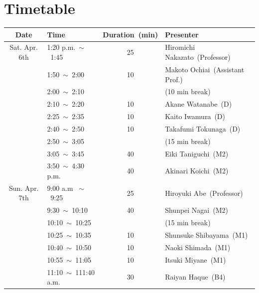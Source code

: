 \documentclass[unicode,a4paper,11pt]{ltjsarticle}
\begin{document}
\clearpage

\section{Timetable}

\begin{center}
      \begin{tabular}{clcl}\hline
            Date          & Time                       & Duration\ (min) & Presenter                        \\ \hline
            Sat. Apr. 6th & 1:20 p.m.\ $\sim$\ 1:45    & 25              & Hiromichi Nakazato\ (Professor)  \\
                          & 1:50\ $\sim$\ 2:00         & 10              & Makoto Ochiai\ (Assistant Prof.) \\
                          & 2:00\ $\sim$\ 2:10         &                 & (10 min break)                   \\
                          & 2:10\ $\sim$\ 2:20         & 10              & Akane Watanabe\ (D)              \\
                          & 2:25\ $\sim$\ 2:35         & 10              & Kaito Iwamura\ (D)               \\
                          & 2:40\ $\sim$\ 2:50         & 10              & Takafumi Tokunaga\ (D)           \\
                          & 2:50\ $\sim$\ 3:05         &                 & (15 min break)                   \\
                          & 3:05\ $\sim$\ 3:45         & 40              & Eiki Taniguchi\ (M2)             \\
                          & 3:50\ $\sim$\ 4:30 p.m.    & 40              & Akinari Koichi\ (M2)             \\ \hline
            Sun. Apr. 7th & 9:00 a.m \ $\sim$\ 9:25    & 25              & Hiroyuki Abe\ (Professor)        \\
                          & 9:30\ $\sim$\ 10:10        & 40              & Shunpei Nagai\ (M2)              \\
                          & 10:10\ $\sim$\ 10:25       &                 & (15 min break)                   \\
                          & 10:25\ $\sim$\ 10:35       & 10              & Shunsuke Shibayama\ (M1)         \\
                          & 10:40\ $\sim$\ 10:50       & 10              & Naoki Shimada\ (M1)              \\
                          & 10:55\ $\sim$\ 11:05       & 10              & Itsuki Miyane\ (M1)              \\
                          & 11:10\ $\sim$\ 111:40 a.m. & 30              & Raiyan Haque\ (B4)               \\ \hline
      \end{tabular}
\end{center}
\end{document}

